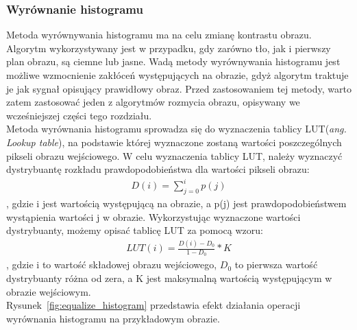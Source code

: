 \subsubsection{Wyrównanie histogramu}
Metoda wyrównywania histogramu ma na celu zmianę kontrastu obrazu. Algorytm wykorzystywany jest w przypadku, gdy zarówno tło, jak i pierwszy plan obrazu, są ciemne lub jasne. Wadą metody wyrównywania histogramu jest możliwe wzmocnienie zakłóceń występujących na obrazie, gdyż algorytm traktuje je jak sygnał opisujący prawidłowy obraz. Przed zastosowaniem tej metody, warto zatem zastosować jeden z algorytmów rozmycia obrazu, opisywany we wcześniejszej części tego rozdziału.\\
Metoda wyrównania histogramu sprowadza się do wyznaczenia tablicy LUT(\textit{ang. Lookup table}), na podstawie której wyznaczone zostaną wartości poszczególnych pikseli obrazu wejściowego. W celu wyznaczenia tablicy LUT, należy wyznaczyć dystrybuantę rozkładu prawdopodobieństwa dla wartości pikseli obrazu:
\begin{gather*}
  D(i) = \sum\limits_{j=0}^i p(j)
\end{gather*}, gdzie i jest wartością występującą na obrazie, a p(j) jest prawdopodobieństwem wystąpienia wartości j w obrazie. Wykorzystując wyznaczone wartości dystrybuanty, możemy opisać tablicę LUT za pomocą wzoru:
\begin{gather*}
  LUT(i) = \frac{D(i)-D_0}{1-D_0}*K
\end{gather*}, gdzie i to wartość składowej obrazu wejściowego, $D_0$ to pierwsza wartość dystrybuanty różna od zera, a K jest maksymalną wartością występującym w obrazie wejściowym.\\
Rysunek~\ref{fig:equalize_histogram} przedstawia efekt działania operacji wyrównania histogramu na przykładowym obrazie.
